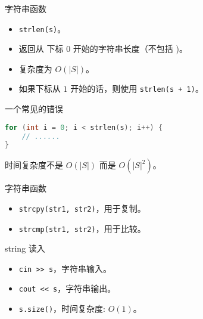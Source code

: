 \begin{frame}{字符串函数}
\begin{itemize}
    \item \texttt{strlen(s)}。
    \item 返回从  下标 $0$ 开始的字符串长度（不包括 )。
    \item 复杂度为 $O(|S|)$。
    \item 如果下标从 $1$ 开始的话，则使用 \texttt{strlen(s + 1)}。
\end{itemize}
\end{frame}

\begin{frame}[fragile]{一个常见的错误}
\begin{lstlisting}[language=C++]
for (int i = 0; i < strlen(s); i++) {
    // ......
}
\end{lstlisting}

时间复杂度不是 $O(|S|)$ 而是 $O(|S|^2)$。
\end{frame}

\begin{frame}{字符串函数}
\begin{itemize}
    \item \texttt{strcpy(str1, str2)}，用于复制。
    \item \texttt{strcmp(str1, str2)}，用于比较。
\end{itemize}
\end{frame}

\begin{frame}{string 读入}
\begin{itemize}
    \item \texttt{cin >> s}，字符串输入。
    \item \texttt{cout << s}，字符串输出。
    \item \texttt{s.size()}，时间复杂度: $O(1)$。
\end{itemize}
\end{frame}
